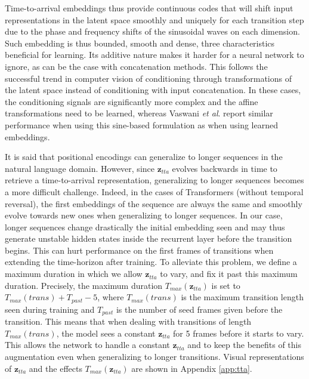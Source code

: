 \documentclass[acmtog]{acmart}
\newcommand{\bz}{\textbf{z}}
\newcommand{\etal}{\textit{et al}. }
\begin{document}
Time-to-arrival embeddings thus provide continuous codes that will shift input representations in the latent space smoothly and uniquely for each transition step due to the phase and frequency shifts of the sinusoidal waves on each dimension. Such embedding is thus bounded, smooth and dense, three characteristics beneficial for learning. Its additive nature makes it harder for a neural network to ignore, as can be the case with concatenation methods. This follows the successful trend in computer vision \cite{dumoulin2017learned, perez2018film} of conditioning through transformations of the latent space instead of conditioning with input concatenation.
In these cases, the conditioning signals are significantly more complex and the affine transformations need to be learned, whereas Vaswani \etal {} report similar performance when using this sine-based formulation as when using learned embeddings.


It is said that positional encodings can generalize to longer sequences in the natural language domain. However, since $\bz_{\mathit{tta}}$ evolves backwards in time to retrieve a time-to-arrival representation, generalizing to longer sequences becomes a more difficult challenge. Indeed, in the cases of Transformers (without temporal reversal), the first embeddings of the sequence are always the same and smoothly evolve towards new ones when generalizing to longer sequences. In our case, longer sequences change drastically the initial embedding seen and may thus generate unstable hidden states inside the recurrent layer before the transition begins. This can hurt performance on the first frames of transitions when extending the time-horizon after training. To alleviate this problem, we define a maximum duration in which we allow $\bz_{\mathit{tta}}$ to vary, and fix it past this maximum duration. Precisely, the maximum duration $T_{\mathit{max}}(\bz_{\mathit{tta}})$ is set to $T_{max}(\mathit{trans}) + T_{past} - 5$, where $T_{\mathit{max}}(\mathit{trans})$ is the maximum transition length seen during training and $T_{\mathit{past}}$ is the number of seed frames given before the transition. This means that when dealing with transitions of length $T_{\mathit{max}}(\mathit{trans})$, the model sees a constant $\bz_{\mathit{tta}}$ for 5 frames before it starts to vary.
This allows the network to handle a constant $\bz_{\mathit{tta}}$ and to keep the benefits of this augmentation even when generalizing to longer transitions. Visual representations of $\bz_{\mathit{tta}}$ and the effects $T_{\mathit{max}}(\bz_{\mathit{tta}})$ are shown in Appendix \ref{app:tta}.
\end{document}
